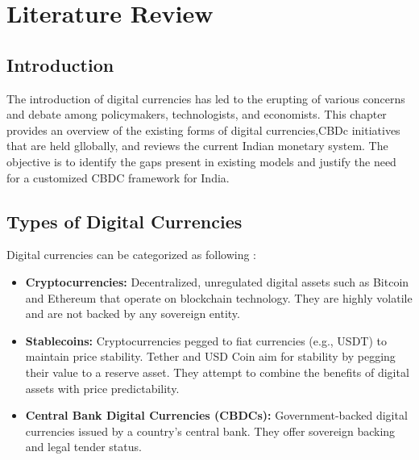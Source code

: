 %
\chapter{Literature Review}
\label{chp2}

\section{Introduction}
The introduction of digital currencies has led to the erupting of various concerns and debate among policymakers, technologists, and economists. This chapter provides an overview of the existing forms of digital currencies,CBDc initiatives that are held gllobally, and reviews the current Indian monetary system.
The objective is to identify the gaps present in existing models and justify the need for a customized CBDC framework for India.

\section{Types of Digital Currencies}
Digital currencies can be categorized as following  :

\begin{itemize}
    \item \textbf{Cryptocurrencies:} Decentralized, unregulated digital assets such as Bitcoin and Ethereum that operate on blockchain technology. They are highly volatile and are not backed by any sovereign entity.

    \item \textbf{Stablecoins:} Cryptocurrencies pegged to fiat currencies (e.g., USDT) to maintain price stability. Tether and USD Coin aim for stability by pegging their value to a reserve asset. They attempt to combine the benefits of digital assets with price predictability.

    \item \textbf{Central Bank Digital Currencies (CBDCs):} Government-backed digital currencies issued by a country’s central bank. They offer sovereign backing and legal tender status.
\end{itemize}


